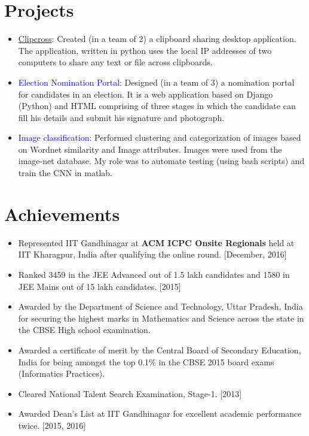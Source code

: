 \documentclass[margin, centered]{res}
\begin{document}
\begin{resume}
\section{Projects}
\begin{itemize}[leftmargin=*]
\item \href{https://github.com/arikpamnani/clipcross}{Clipcross}: Created (in a team of 2) a clipboard sharing desktop application. The application, written in python uses the local IP addresses of two computers to share any text or file across clipboards.

\item \textcolor{blue}{Election Nomination Portal}: Designed (in a team of 3) a nomination portal for candidates in an election. It is a web application based on Django (Python) and HTML comprising of three stages in which the candidate can fill his details and submit his signature and photograph.

\item \textcolor{blue}{Image classification}: Performed clustering and categorization of images based on Wordnet similarity and Image attributes. Images were used from the image-net database. My role was to automate testing (using bash scripts) and train the CNN in matlab. 

\end{itemize}

\section{Achievements}
\begin{itemize}[leftmargin=*]
\item Represented IIT Gandhinagar at {\bf ACM ICPC Onsite Regionals} held at IIT Kharagpur, India after qualifying the online round. 
\hfill {[December, 2016]}
\item Ranked 3459 in the JEE Advanced out of 1.5 lakh candidates and 1580 in JEE Mains out of 15 lakh candidates.
\hfill {[2015]}
\item Awarded by the Department of Science and Technology, Uttar Pradesh, India for securing the highest marks in Mathematics and Science across the state in the CBSE High school examination.
\item Awarded a certificate of merit by the Central Board of Secondary Education, India for being amongst the top 0.1\% in the CBSE 2015 board exams (Informatics Practices).
\item Cleared National Talent Search Examination, Stage-1. \hfill{[2013]}
\item Awarded Dean{'}s List at IIT Gandhinagar for excellent academic performance twice. \hfill{[2015, 2016]}
\end{itemize}


\end{resume}
\end{document}

